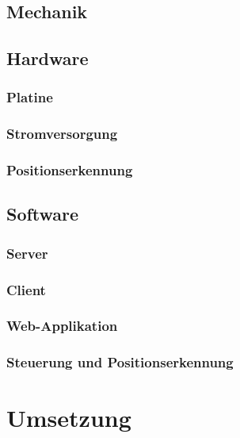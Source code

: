 \section{Mechanik}
\section{Hardware}
\subsection{Platine}
\subsection{Stromversorgung}
\subsection{Positionserkennung}

\section{Software}
\subsection{Server}
\subsection{Client}
\subsection{Web-Applikation}
\subsection{Steuerung und Positionserkennung}

\chapter{Umsetzung}

\lipsum